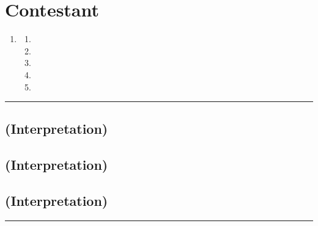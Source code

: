 \documentclass[draft]{report}
\newenvironment{expl}[0]%
  {\rule{\textwidth}{.2pt}\footnotesize}%
  {\rule{\textwidth}{.2pt}\normalsize}
\begin{document}
\chapter{Contestant}\label{contestant}

\begin{enumerate}
\item


  \begin{enumerate}
  \item
  
  \item
  
  \item
  
  \item
  
  \item
  
  \end{enumerate}
\end{enumerate}

\begin{expl}
\section{(Interpretation)}\label{interpretation-1}


\section{(Interpretation)}\label{interpretation-2}


\section{(Interpretation)}\label{interpretation-3}

\end{expl}
\end{document}
